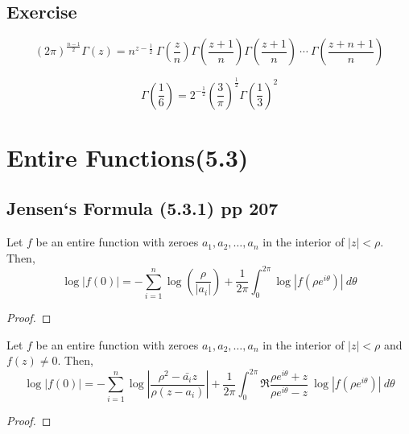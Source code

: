 \subsection*{Exercise}
\begin{remark}
	\begin{equation}
		(2\pi)^\frac{n-1}{2} \Gamma(z) = n^{z-\frac{1}{2}} \ \Gamma\left(\frac{z}{n}\right) \Gamma\left(\frac{z+1}{n}\right) \Gamma\left(\frac{z+1}{n}\right) \ \cdots \ \Gamma\left(\frac{z+n+1}{n}\right)
	\end{equation}
\end{remark}

\begin{remark}
	\begin{equation}
		\Gamma\left(\frac{1}{6}\right) = 2^{-\frac{1}{2}} \left( \frac{3}{\pi}\right)^\frac{1}{2} \Gamma\left(\frac{1}{3}\right)^2
	\end{equation}
\end{remark}

\section{Entire Functions(5.3)}
\subsection{Jensen`s Formula (5.3.1) pp 207}
\begin{remark}
	Let $f$ be an entire function with zeroes $a_1,a_2,\dots,a_n$ in the interior of $|z| < \rho$.
	Then,
	\begin{equation}
		\log |f(0)| = -\sum_{i=1}^n \log \left( \frac{\rho}{|a_i|} \right) + \frac{1}{2\pi} \int_0^{2\pi} \log \left| f\left(\rho e^{i\theta}\right) \right| \ d\theta
	\end{equation}
\end{remark}
\begin{proof}
\end{proof}
\begin{remark}
	Let $f$ be an entire function with zeroes $a_1,a_2,\dots,a_n$ in the interior of $|z| < \rho$ and $f(z) \ne 0$.
	Then,
	\begin{equation}
		\log |f(0)| = -\sum_{i=1}^n \log \left| \frac{\rho^2-\bar{a_i}z}{\rho(z-a_i)} \right| + \frac{1}{2\pi} \int_0^{2\pi} \Re \frac{\rho e^{i \theta}+z}{\rho e^{i \theta} - z}\ \log \left| f\left(\rho e^{i\theta}\right) \right| \ d\theta
	\end{equation}
\end{remark}
\begin{proof}
\end{proof}

